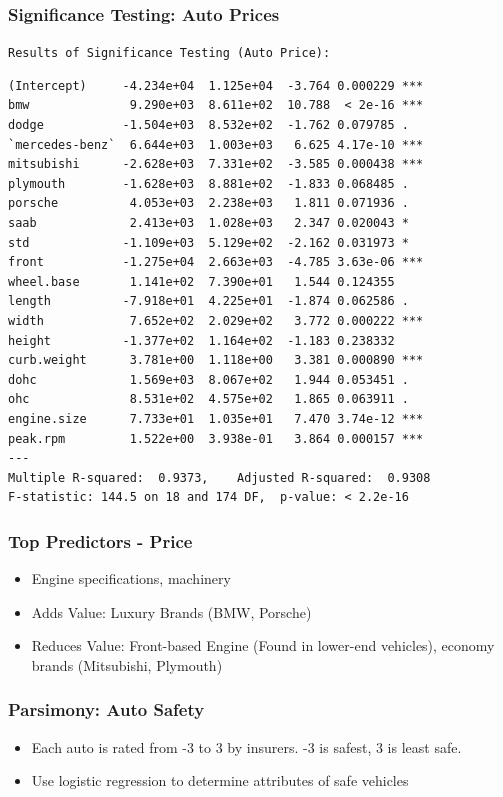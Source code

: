 \documentclass{beamer}
\begin{document}
\begin{frame}[fragile]
\frametitle{Significance Testing: Auto Prices}
\texttt{Results of Significance Testing (Auto Price):}\\
\tiny{ 
\begin{verbatim}
(Intercept)     -4.234e+04  1.125e+04  -3.764 0.000229 ***
bmw              9.290e+03  8.611e+02  10.788  < 2e-16 ***
dodge           -1.504e+03  8.532e+02  -1.762 0.079785 .  
`mercedes-benz`  6.644e+03  1.003e+03   6.625 4.17e-10 ***
mitsubishi      -2.628e+03  7.331e+02  -3.585 0.000438 ***
plymouth        -1.628e+03  8.881e+02  -1.833 0.068485 .  
porsche          4.053e+03  2.238e+03   1.811 0.071936 .  
saab             2.413e+03  1.028e+03   2.347 0.020043 *  
std             -1.109e+03  5.129e+02  -2.162 0.031973 *  
front           -1.275e+04  2.663e+03  -4.785 3.63e-06 ***
wheel.base       1.141e+02  7.390e+01   1.544 0.124355    
length          -7.918e+01  4.225e+01  -1.874 0.062586 .  
width            7.652e+02  2.029e+02   3.772 0.000222 ***
height          -1.377e+02  1.164e+02  -1.183 0.238332    
curb.weight      3.781e+00  1.118e+00   3.381 0.000890 ***
dohc             1.569e+03  8.067e+02   1.944 0.053451 .  
ohc              8.531e+02  4.575e+02   1.865 0.063911 .  
engine.size      7.733e+01  1.035e+01   7.470 3.74e-12 ***
peak.rpm         1.522e+00  3.938e-01   3.864 0.000157 ***
---
Multiple R-squared:  0.9373,	Adjusted R-squared:  0.9308 
F-statistic: 144.5 on 18 and 174 DF,  p-value: < 2.2e-16  
\end{verbatim}
}
\end{frame}

\begin{frame}
\frametitle{Top Predictors - Price}
\begin{itemize}
  \item Engine specifications, machinery
  \item Adds Value: Luxury Brands (BMW, Porsche)
  \item Reduces Value: Front-based Engine (Found in lower-end vehicles), economy brands (Mitsubishi, Plymouth)
\end{itemize}
\end{frame}

\begin{frame}
\frametitle{Parsimony: Auto Safety}
\begin{itemize}
  \item Each auto is rated from -3 to 3 by insurers.  -3 is safest, 3 is least safe.
  \item Use logistic regression to determine attributes of safe vehicles
\end{itemize}

\end{frame}
\end{document}
